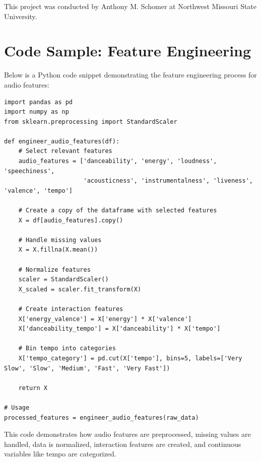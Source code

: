 \documentclass[runningheads]{llncs}
\begin{document}
\vspace{1em}
This project was conducted by Anthony M. Schomer at Northwest Missouri State University.

\appendix
\section{Code Sample: Feature Engineering}

Below is a Python code snippet demonstrating the feature engineering process for audio features:

\begin{verbatim}
import pandas as pd
import numpy as np
from sklearn.preprocessing import StandardScaler

def engineer_audio_features(df):
    # Select relevant features
    audio_features = ['danceability', 'energy', 'loudness', 'speechiness', 
                      'acousticness', 'instrumentalness', 'liveness', 'valence', 'tempo']
    
    # Create a copy of the dataframe with selected features
    X = df[audio_features].copy()
    
    # Handle missing values
    X = X.fillna(X.mean())
    
    # Normalize features
    scaler = StandardScaler()
    X_scaled = scaler.fit_transform(X)
    
    # Create interaction features
    X['energy_valence'] = X['energy'] * X['valence']
    X['danceability_tempo'] = X['danceability'] * X['tempo']
    
    # Bin tempo into categories
    X['tempo_category'] = pd.cut(X['tempo'], bins=5, labels=['Very Slow', 'Slow', 'Medium', 'Fast', 'Very Fast'])
    
    return X

# Usage
processed_features = engineer_audio_features(raw_data)
\end{verbatim}

This code demonstrates how audio features are preprocessed, missing values are handled, data is normalized, interaction features are created, and continuous variables like tempo are categorized.
\end{document}
